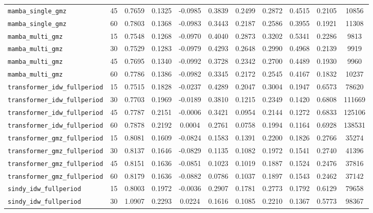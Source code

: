 \documentclass[12pt, a4paper]{article}
\begin{document}
{\begin{longtable}{p{4.0cm}cccccccccc}
\texttt{mamba\_single\_gmz} & 45 & 0.7659 & 0.1325 & -0.0985 & 0.3839 & 0.2499 & 0.2872 & 0.4515 & 0.2105 & 10856 \\
\texttt{mamba\_single\_gmz} & 60 & 0.7803 & 0.1368 & -0.0983 & 0.3443 & 0.2187 & 0.2586 & 0.3955 & 0.1921 & 11308 \\
\addlinespace[1pt]
\texttt{mamba\_multi\_gmz} & 15 & 0.7548 & 0.1268 & -0.0970 & 0.4040 & 0.2873 & 0.3202 & 0.5341 & 0.2286 & 9813 \\
\texttt{mamba\_multi\_gmz} & 30 & 0.7529 & 0.1283 & -0.0979 & 0.4293 & 0.2648 & 0.2990 & 0.4968 & 0.2139 & 9919 \\
\texttt{mamba\_multi\_gmz} & 45 & 0.7695 & 0.1340 & -0.0992 & 0.3728 & 0.2342 & 0.2700 & 0.4489 & 0.1930 & 9960 \\
\texttt{mamba\_multi\_gmz} & 60 & 0.7786 & 0.1386 & -0.0982 & 0.3345 & 0.2172 & 0.2545 & 0.4167 & 0.1832 & 10237 \\
\addlinespace[1pt]
\texttt{transformer\_idw\_fullperiod} & 15 & 0.7515 & 0.1828 & -0.0237 & 0.4289 & 0.2047 & 0.3004 & 0.1947 & 0.6573 & 78620 \\
\texttt{transformer\_idw\_fullperiod} & 30 & 0.7703 & 0.1969 & -0.0189 & 0.3810 & 0.1215 & 0.2349 & 0.1420 & 0.6808 & 111669 \\
\texttt{transformer\_idw\_fullperiod} & 45 & 0.7787 & 0.2151 & -0.0006 & 0.3421 & 0.0954 & 0.2144 & 0.1272 & 0.6833 & 125106 \\
\texttt{transformer\_idw\_fullperiod} & 60 & 0.7878 & 0.2192 & 0.0004 & 0.2761 & 0.0758 & 0.1994 & 0.1164 & 0.6928 & 138531 \\
\addlinespace[1pt]
\texttt{transformer\_gmz\_fullperiod} & 15 & 0.8081 & 0.1609 & -0.0824 & 0.1583 & 0.1391 & 0.2200 & 0.1826 & 0.2766 & 35274 \\
\texttt{transformer\_gmz\_fullperiod} & 30 & 0.8137 & 0.1646 & -0.0829 & 0.1135 & 0.1082 & 0.1972 & 0.1541 & 0.2740 & 41396 \\
\texttt{transformer\_gmz\_fullperiod} & 45 & 0.8151 & 0.1636 & -0.0851 & 0.1023 & 0.1019 & 0.1887 & 0.1524 & 0.2476 & 37816 \\
\texttt{transformer\_gmz\_fullperiod} & 60 & 0.8179 & 0.1636 & -0.0882 & 0.0786 & 0.1037 & 0.1897 & 0.1543 & 0.2462 & 37142 \\
\addlinespace[1pt]
\texttt{sindy\_idw\_fullperiod} & 15 & 0.8003 & 0.1972 & -0.0036 & 0.2907 & 0.1781 & 0.2773 & 0.1792 & 0.6129 & 79658 \\
\texttt{sindy\_idw\_fullperiod} & 30 & 1.0907 & 0.2293 & 0.0224 & 0.1616 & 0.1085 & 0.2210 & 0.1367 & 0.5773 & 98367 \\

\end{longtable}}
\end{document}
